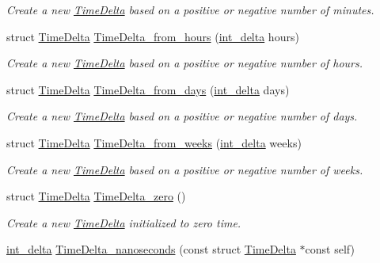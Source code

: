 \begin{DoxyCompactItemize}
\begin{DoxyCompactList}\small\item\em \-Create a new \hyperlink{structTimeDelta}{\-Time\-Delta} based on a positive or negative number of minutes. \end{DoxyCompactList}\item 
struct \hyperlink{structTimeDelta}{\-Time\-Delta} \hyperlink{time-delta_8h_a56f1c443994cd0cbe306cd04e378eabe}{\-Time\-Delta\-\_\-from\-\_\-hours} (\hyperlink{types_8h_a8a67cf99971c5cfeeaa2380ba84a4c92}{int\-\_\-delta} hours)
\begin{DoxyCompactList}\small\item\em \-Create a new \hyperlink{structTimeDelta}{\-Time\-Delta} based on a positive or negative number of hours. \end{DoxyCompactList}\item 
struct \hyperlink{structTimeDelta}{\-Time\-Delta} \hyperlink{time-delta_8h_a63cc9a37b13e1ea2c9517a15254761dd}{\-Time\-Delta\-\_\-from\-\_\-days} (\hyperlink{types_8h_a8a67cf99971c5cfeeaa2380ba84a4c92}{int\-\_\-delta} days)
\begin{DoxyCompactList}\small\item\em \-Create a new \hyperlink{structTimeDelta}{\-Time\-Delta} based on a positive or negative number of days. \end{DoxyCompactList}\item 
struct \hyperlink{structTimeDelta}{\-Time\-Delta} \hyperlink{time-delta_8h_adeaef2754da892c29f03834c14ad1204}{\-Time\-Delta\-\_\-from\-\_\-weeks} (\hyperlink{types_8h_a8a67cf99971c5cfeeaa2380ba84a4c92}{int\-\_\-delta} weeks)
\begin{DoxyCompactList}\small\item\em \-Create a new \hyperlink{structTimeDelta}{\-Time\-Delta} based on a positive or negative number of weeks. \end{DoxyCompactList}\item 
struct \hyperlink{structTimeDelta}{\-Time\-Delta} \hyperlink{time-delta_8h_a4d78cdef19464e2c645923c831f38910}{\-Time\-Delta\-\_\-zero} ()
\begin{DoxyCompactList}\small\item\em \-Create a new \hyperlink{structTimeDelta}{\-Time\-Delta} initialized to zero time. \end{DoxyCompactList}\item 
\hyperlink{types_8h_a8a67cf99971c5cfeeaa2380ba84a4c92}{int\-\_\-delta} \hyperlink{time-delta_8h_a6bb384cf10338d51d1e40fdde5d032b8}{\-Time\-Delta\-\_\-nanoseconds} (const struct \hyperlink{structTimeDelta}{\-Time\-Delta} $\ast$const self)

\end{DoxyCompactItemize}
